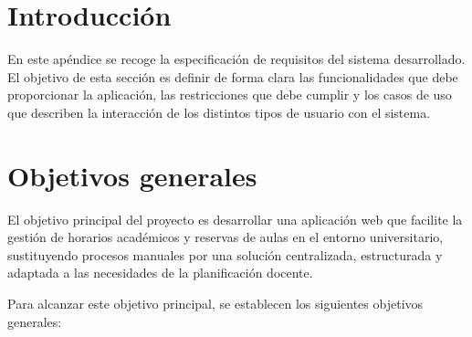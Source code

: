 
\section{Introducción}

En este apéndice se recoge la especificación de requisitos del sistema desarrollado. El objetivo de esta sección es definir de forma clara las funcionalidades que debe proporcionar la aplicación, las restricciones que debe cumplir y los casos de uso que describen la interacción de los distintos tipos de usuario con el sistema.

\section{Objetivos generales}

El objetivo principal del proyecto es desarrollar una aplicación web que facilite la gestión de horarios académicos y reservas de aulas en el entorno universitario, sustituyendo procesos manuales por una solución centralizada, estructurada y adaptada a las necesidades de la planificación docente.

Para alcanzar este objetivo principal, se establecen los siguientes objetivos generales:

